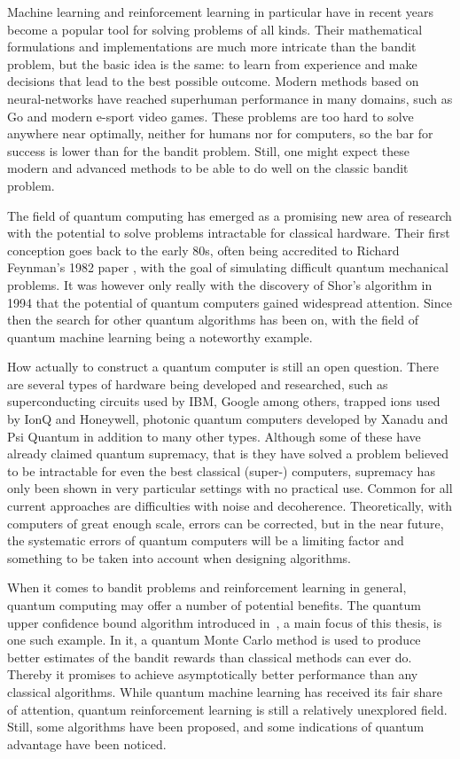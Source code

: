 Machine learning and reinforcement learning in particular have in recent years become a popular tool for solving problems of all kinds.
Their mathematical formulations and implementations are much more intricate than the bandit problem, but the basic idea is the same: to learn from experience and make decisions that lead to the best possible outcome.
Modern methods based on neural-networks have reached superhuman performance in many domains, such as Go and modern e-sport video games.
These problems are too hard to solve anywhere near optimally, neither for humans nor for computers, so the bar for success is lower than for the bandit problem.
Still, one might expect these modern and advanced methods to be able to do well on the classic bandit problem.

The field of quantum computing has emerged as a promising new area of research with the potential to solve problems intractable for classical hardware.
Their first conception goes back to the early 80s, often being accredited to Richard Feynman's 1982 paper \cite{feynman1982}, with the goal of simulating difficult quantum mechanical problems.
It was however only really with the discovery of Shor's algorithm in 1994 \cite{shor1994} that the potential of quantum computers gained widespread attention.
Since then the search for other quantum algorithms has been on, with the field of quantum machine learning being a noteworthy example.

How actually to construct a quantum computer is still an open question.
There are several types of hardware being developed and researched, such as superconducting circuits used by IBM, Google among others, trapped ions used by IonQ and Honeywell, photonic quantum computers developed by Xanadu and Psi Quantum in addition to many other types.
Although some of these have already claimed quantum supremacy, that is they have solved a problem believed to be intractable for even the best classical (super-) computers, supremacy has only been shown in very particular settings with no practical use.
Common for all current approaches are difficulties with noise and decoherence.
Theoretically, with computers of great enough scale, errors can be corrected, but in the near future, the systematic errors of quantum computers will be a limiting factor and something to be taken into account when designing algorithms.

When it comes to bandit problems and reinforcement learning in general, quantum computing may offer a number of potential benefits.
The quantum upper confidence bound algorithm introduced in~\autocite{wan2022}, a main focus of this thesis, is one such example.
In it, a quantum Monte Carlo method is used to produce better estimates of the bandit rewards than classical methods can ever do.
Thereby it promises to achieve asymptotically better performance than any classical algorithms.
While quantum machine learning has received its fair share of attention, quantum reinforcement learning is still a relatively unexplored field.
Still, some algorithms have been proposed, and some indications of quantum advantage have been noticed.


